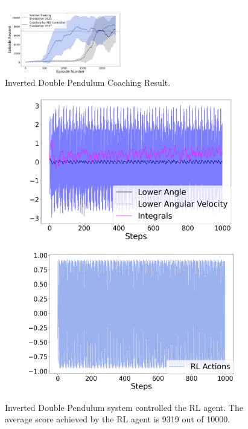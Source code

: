 \documentclass{IJCAS}
\begin{document}
\begin{figure}[H]
\centering
\includegraphics[width=0.5\textwidth]{double.png}
\caption{Inverted Double Pendulum Coaching Result.}
\label{fig:double_result}
\end{figure}
\begin{figure}[H]
\centering
\begin{subfigure}{0.25\textwidth}
\centering
\includegraphics[width=\linewidth]{double_RL.png}
\end{subfigure}%
\begin{subfigure}{.25\textwidth}
\centering
\includegraphics[width=\linewidth]{double_RL_actions.png}
\end{subfigure}
\caption{Inverted Double Pendulum system controlled the RL agent. The average score achieved by the RL agent is 9319 out of 10000.}
\label{fig:double_rl}
\end{figure}
\end{document}
